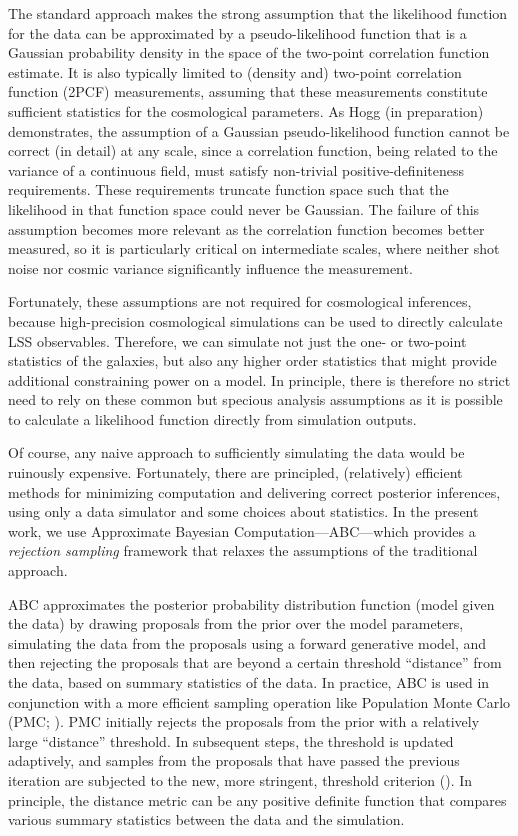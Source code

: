 The standard approach makes the strong assumption that the likelihood function 
for the data can be approximated by a pseudo-likelihood function that is a Gaussian
probability density in the space of the two-point correlation function estimate. 
It is also typically limited to (density and) two-point correlation 
function (2PCF) measurements, assuming that these measurements constitute 
sufficient statistics for the cosmological parameters. 
As Hogg (in preparation) demonstrates, the assumption of a Gaussian 
pseudo-likelihood function cannot be correct (in detail) at any scale, 
since a correlation function, being related to the 
variance of a continuous field, must satisfy non-trivial positive-definiteness 
requirements. These requirements truncate function space such that the 
likelihood in that function space could never be Gaussian. The failure of this 
assumption becomes more relevant as the correlation function becomes better measured, 
so it is particularly critical on intermediate scales, where neither shot 
noise nor cosmic variance significantly influence the measurement. 

Fortunately, these assumptions are not required for cosmological inferences, 
because high-precision cosmological simulations can be used to directly calculate 
LSS observables. Therefore, we can simulate not just the one- or two-point statistics of the galaxies, but also any higher order statistics that might provide additional constraining power on a model. In principle, there is therefore no strict need to rely on these common but specious analysis  assumptions as it is possible to calculate a likelihood function directly from simulation outputs.

Of course, any naive approach to sufficiently simulating the data would be ruinously
expensive. Fortunately, there are principled, (relatively) efficient methods for 
minimizing computation and delivering correct posterior inferences, using only a 
data simulator and some choices about statistics. 
In the present work, we use Approximate Bayesian Computation---ABC---which provides a \emph{rejection sampling} 
framework that relaxes the assumptions of the traditional approach. 

ABC approximates the posterior probability distribution function (model given the data)
by drawing proposals from the prior over the model parameters, simulating the data from the 
proposals using a forward generative model, and then rejecting the proposals that are beyond 
a certain threshold ``distance'' from the data, based on summary statistics of the data. 
In practice, ABC is used in conjunction with a more efficient sampling operation like 
Population Monte Carlo (PMC; \citealt{smc}). 
PMC initially rejects the proposals from the prior with a relatively large ``distance'' threshold. 
In subsequent steps, the threshold is updated adaptively, and samples from the proposals that have 
passed the previous iteration are subjected to the new, more stringent, threshold criterion (\citealt{abcpmc}). 
In principle, the distance metric can be any positive definite function that compares 
various summary statistics between the data and the simulation.  

